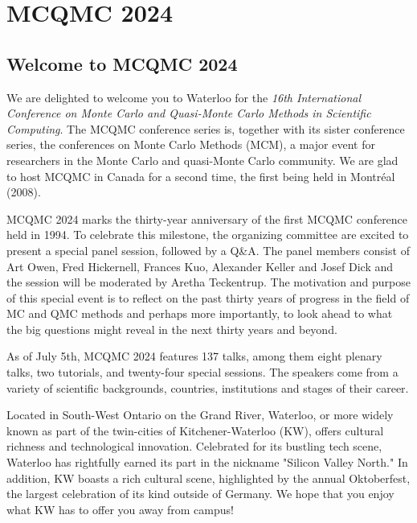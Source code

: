 \chapter{MCQMC 2024}


\section{Welcome to MCQMC 2024}

We are delighted to welcome you to Waterloo for the \emph{16th International Conference on Monte Carlo and Quasi-Monte Carlo Methods in Scientific Computing}. The MCQMC conference series is, together with its sister conference series, the conferences on Monte Carlo Methods (MCM), a major event for researchers in the Monte Carlo and quasi-Monte Carlo community. We are glad to host MCQMC in Canada for a second time, the first being held in Montr\'{e}al (2008).


MCQMC 2024 marks the thirty-year anniversary of the first MCQMC conference held in 1994. To celebrate this milestone, the organizing committee are excited to present a special panel session, followed by a Q\&A. The panel members consist of Art Owen, Fred Hickernell, Frances Kuo, Alexander Keller and Josef Dick and the session will be moderated by Aretha Teckentrup. The motivation and purpose of this special event is to reflect on the past thirty years of progress in the field of MC and QMC methods and perhaps more importantly, to look ahead to what the big questions might reveal in the next thirty years and beyond.

As of July 5th, MCQMC 2024 features 137 talks, 
among them eight plenary talks, two tutorials, and twenty-four special sessions. 
The speakers come from a variety of scientific backgrounds, countries, institutions and stages of their career. 

Located in South-West Ontario on the Grand River, Waterloo, or more widely known as part of the twin-cities of Kitchener-Waterloo (KW), offers cultural richness and technological innovation. Celebrated for its bustling tech scene, Waterloo has rightfully earned its part in the nickname "Silicon Valley North." In addition, KW boasts a rich cultural scene, highlighted by the annual Oktoberfest, the largest celebration of its kind outside of Germany. We hope that you enjoy what KW has to offer you away from campus!

